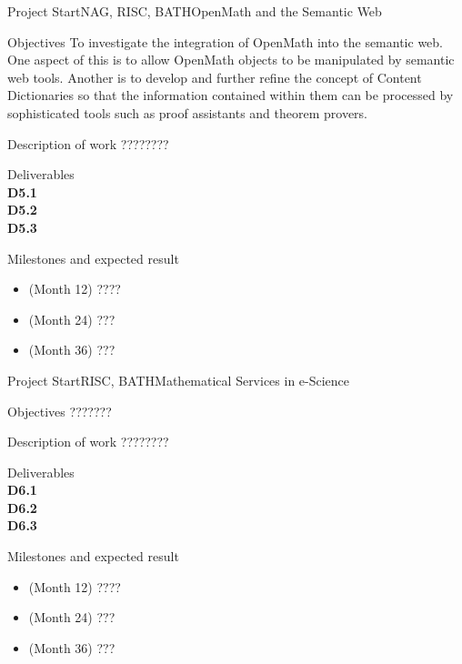 \documentclass{euproposal}
\begin{document}
\begin{workpackage}{36}{5}{Project Start}{NAG, RISC, BATH}{OpenMath and the Semantic Web}
\begin{wpbox}{Objectives}
  To investigate the integration of OpenMath into the semantic web.  One aspect of
  this is to allow OpenMath objects to be manipulated by semantic web tools.
  Another is to develop and further refine the concept of Content Dictionaries so
  that the information contained within them can be processed by sophisticated
  tools such as proof assistants and theorem provers.
\end{wpbox}
\begin{wpbox}{Description of work}
  ????????
\end{wpbox}
\begin{wpbox}{Deliverables\\}
{\bf D5.1} \\
{\bf D5.2} \\
{\bf D5.3} 
\end{wpbox}
\begin{wpbox}{Milestones and expected result}
\begin{itemize}
\item (Month 12) ????
\item (Month 24) ???
\item (Month 36) ???
\end{itemize}
\end{wpbox}
\end{workpackage}
\newpage

\begin{workpackage}{36}{6}{Project Start}{RISC, BATH}{Mathematical Services in e-Science}
\begin{wpbox}{Objectives}
  ???????
\end{wpbox}
\begin{wpbox}{Description of work}
  ????????
\end{wpbox}
\begin{wpbox}{Deliverables\\}
{\bf D6.1} \\
{\bf D6.2} \\
{\bf D6.3} 
\end{wpbox}
\begin{wpbox}{Milestones and expected result}
\begin{itemize}
\item (Month 12) ????
\item (Month 24) ???
\item (Month 36) ???
\end{itemize}
\end{wpbox}
\end{workpackage}
\end{document}
